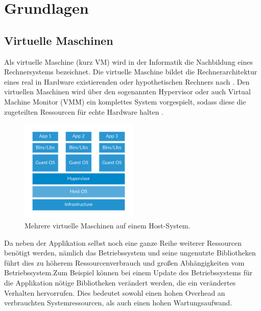 \chapter{Grundlagen}


\section{Virtuelle Maschinen}
Als virtuelle Maschine (kurz VM) wird in der Informatik die Nachbildung eines Rechnersystems bezeichnet. Die virtuelle Maschine bildet die Rechnerarchitektur eines real in Hardware existierenden oder hypothetischen Rechners nach \cite{Sieg2007}. Den virtuellen Maschinen wird über den sogenannten Hypervisor oder auch Virtual Machine Monitor (VMM) ein komplettes System vorgespielt, sodass diese die zugeteilten Ressourcen für echte Hardware halten \cite{OSTEP}.\\

\begin{figure}[!ht] %
  \centering
  \includegraphics[width=0.5\textwidth]{images/1-docker-vm.png}
  \caption{Mehrere virtuelle Maschinen auf einem Host-System. \cite{docker}}
\end{figure}

Da neben der Applikation selbst noch eine ganze Reihe weiterer Ressourcen benötigt werden, nämlich das Betriebssystem und seine ungenutzte Bibliotheken führt dies zu höherem Ressourcenverbrauch und großen Abhängigkeiten vom Betriebssystem.\linebreak Zum Beispiel können bei einem Update des Betriebssystems für die Applikation nötige Bibliotheken verändert werden, die ein verändertes Verhalten hervorrufen. Dies bedeutet sowohl einen hohen Overhead an verbrauchten Systemressourcen, als auch einen hohen Wartungsaufwand.\\

